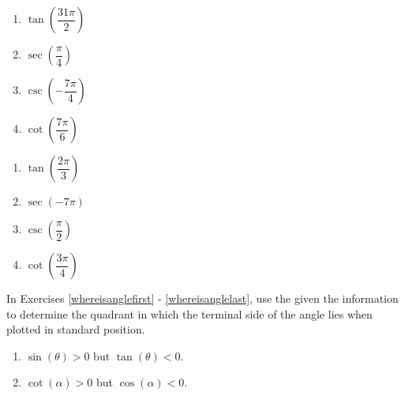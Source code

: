 \begin{multicols}{4}

\begin{enumerate}

\setcounter{enumi}{\value{HW}}

\item $\tan \left( \dfrac{31\pi}{2} \right)$
\item $\sec \left( \dfrac{\pi}{4} \right)$ 
\item $\csc \left( -\dfrac{7\pi}{4} \right)$
\item $\cot \left( \dfrac{7\pi}{6} \right)$

\setcounter{HW}{\value{enumi}}

\end{enumerate}

\end{multicols}

\begin{multicols}{4}

\begin{enumerate}

\setcounter{enumi}{\value{HW}}

\item $\tan \left( \dfrac{2\pi}{3} \right)$
\item $\sec \left( -7\pi \right)$ 
\item $\csc \left( \dfrac{\pi}{2} \right)$ 
\item $\cot \left( \dfrac{3\pi}{4} \right)$ \label{circvaluelast}

\setcounter{HW}{\value{enumi}}

\end{enumerate}

\end{multicols}

In Exercises \ref{whereisanglefirst} - \ref{whereisanglelast}, use the given the information to determine the quadrant in which the terminal side of the angle lies when plotted in standard position.

\begin{multicols}{2}
\begin{enumerate}
\setcounter{enumi}{\value{HW}}

\item  \label{whereisanglefirst} $\sin(\theta) > 0$ but $\tan(\theta) < 0$.

\item  $\cot(\alpha) > 0$ but $\cos(\alpha) < 0$.

\setcounter{HW}{\value{enumi}}
\end{enumerate}
\end{multicols}

